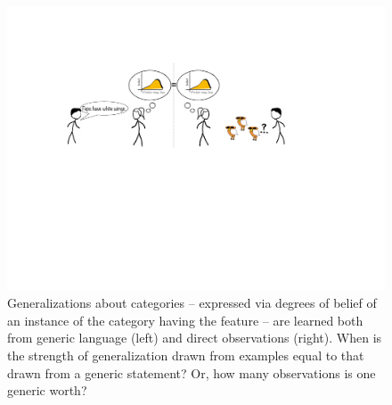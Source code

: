 \documentclass[10pt,letterpaper]{article}
\begin{document}
\begin{figure}[t]
\begin{center}
\includegraphics[width=\linewidth]{figs/cartoon-fig.pdf}
\end{center}
\caption{Generalizations about categories -- expressed via degrees of belief of an instance of the category having the feature -- are learned both from generic language (left) and direct observations (right). When is the strength of generalization drawn from examples equal to that drawn from a generic statement? Or, how many observations is one generic worth?}
\label{fig:cartoon}
\end{figure}

\end{document}
